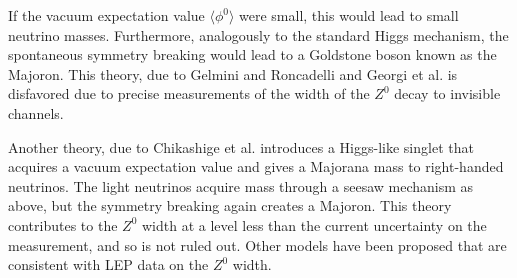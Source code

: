 \documentclass[herrin-thesis.tex]{subfiles}
\begin{document}
If the vacuum expectation value \(\langle\phi^0\rangle\) were small, this would lead to small neutrino masses. Furthermore, analogously to the standard Higgs mechanism, the spontaneous symmetry breaking would lead to a Goldstone boson known as the Majoron. This theory, due to Gelmini and Roncadelli \cite{Gelmini:1981uq} and Georgi et al. \cite{Georgi:1981kx} is disfavored due to precise measurements of the width of the \(Z^{0}\) decay to invisible channels.

Another theory, due to Chikashige et al. \cite{Chikashige:1981vn} introduces a Higgs-like singlet that acquires a vacuum expectation value and gives a Majorana mass to right-handed neutrinos. The light neutrinos acquire mass through a seesaw mechanism as above, but the symmetry breaking again creates a Majoron. This theory contributes to the \(Z^{0}\) width at a level less than the current uncertainty on the measurement, and so is not ruled out. Other models \cite{Berezhiani199299,Bamert:1995fk} have been proposed that are consistent with LEP data on the \(Z^{0}\) width.
\end{document}
